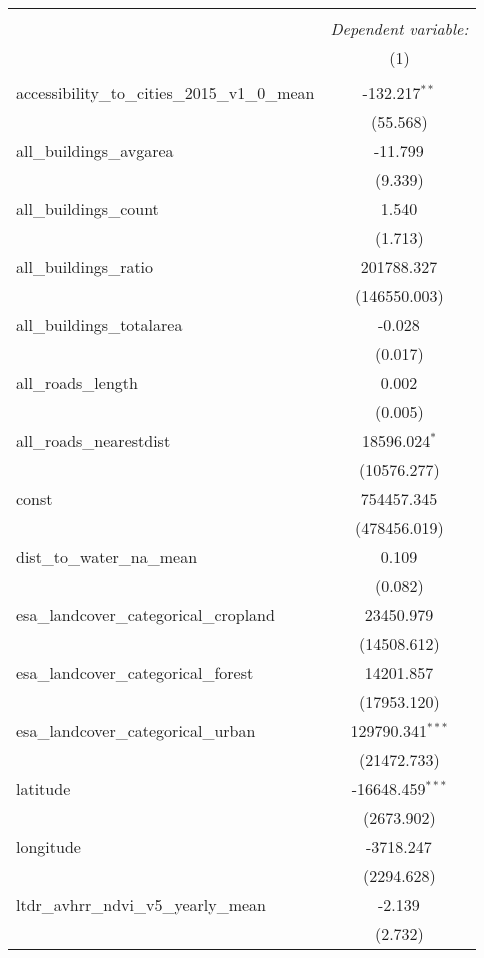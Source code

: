\begin{table}[!htbp] \centering
\begin{tabular}{@{\extracolsep{5pt}}lc}
\\[-1.8ex]\hline
\hline \\[-1.8ex]
& \multicolumn{1}{c}{\textit{Dependent variable:}} \
\cr \cline{1-2}
\\[-1.8ex] & (1) \\
\hline \\[-1.8ex]
 accessibility_to_cities_2015_v1_0_mean & -132.217$^{**}$ \\
  & (55.568) \\
 all_buildings_avgarea & -11.799$^{}$ \\
  & (9.339) \\
 all_buildings_count & 1.540$^{}$ \\
  & (1.713) \\
 all_buildings_ratio & 201788.327$^{}$ \\
  & (146550.003) \\
 all_buildings_totalarea & -0.028$^{}$ \\
  & (0.017) \\
 all_roads_length & 0.002$^{}$ \\
  & (0.005) \\
 all_roads_nearestdist & 18596.024$^{*}$ \\
  & (10576.277) \\
 const & 754457.345$^{}$ \\
  & (478456.019) \\
 dist_to_water_na_mean & 0.109$^{}$ \\
  & (0.082) \\
 esa_landcover_categorical_cropland & 23450.979$^{}$ \\
  & (14508.612) \\
 esa_landcover_categorical_forest & 14201.857$^{}$ \\
  & (17953.120) \\
 esa_landcover_categorical_urban & 129790.341$^{***}$ \\
  & (21472.733) \\
 latitude & -16648.459$^{***}$ \\
  & (2673.902) \\
 longitude & -3718.247$^{}$ \\
  & (2294.628) \\
 ltdr_avhrr_ndvi_v5_yearly_mean & -2.139$^{}$ \\
  & (2.732) \\

\end{tabular}
\end{table}
